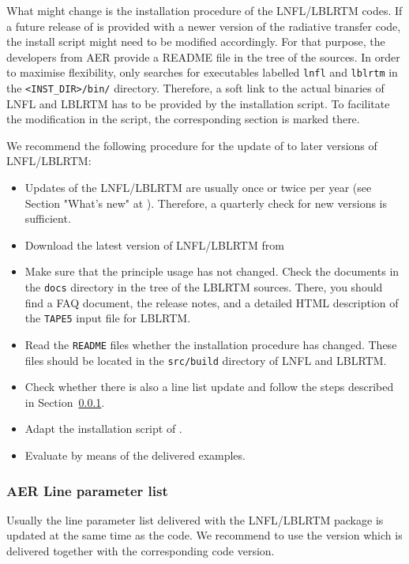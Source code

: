 What might change is the installation procedure of the LNFL/LBLRTM codes. If a
future release of \mf{} is provided with a newer version of the radiative
transfer code, the install script might need to be modified accordingly. For
that purpose, the developers from AER provide a README file in the tree of the
sources. In order to maximise flexibility, \mf{} only searches for executables
labelled {\tt lnfl} and {\tt lblrtm} in the {\tt <INST\_DIR>/bin/}
directory. Therefore, a soft link to the actual binaries of LNFL and LBLRTM has
to be provided by the installation script. To facilitate the modification in
the script, the corresponding section is marked there.

We recommend the following procedure for the update of \mf{} to later versions
of LNFL/LBLRTM:
\begin{itemize}
    \item Updates of the LNFL/LBLRTM are usually once or twice per year (see
Section "What's new" at \cite{LBLRTM}). Therefore, a quarterly check for new
versions is sufficient.
    \item Download the latest version of LNFL/LBLRTM from \cite{LBLRTM}
    \item Make sure that the principle usage has not changed. Check the
documents in the {\tt docs} directory in the tree of the LBLRTM sources. There,
you should find a FAQ document, the release notes, and a detailed HTML
description of the {\tt TAPE5} input file for LBLRTM.
    \item Read the {\tt README} files whether the installation procedure has
changed. These files should be located in the {\tt src/build} directory of LNFL
and LBLRTM.
    \item Check whether there is also a line list update and follow the steps
described in Section~\ref{app:linelist}.
    \item Adapt the installation script of \mf{}.
    \item Evaluate by means of the delivered examples.
\end{itemize}

\subsubsection{AER Line parameter list}\label{app:linelist}
Usually the line parameter list delivered with the LNFL/LBLRTM package is
updated at the same time as the code. We recommend to use the version which is
delivered together with the corresponding code version.

